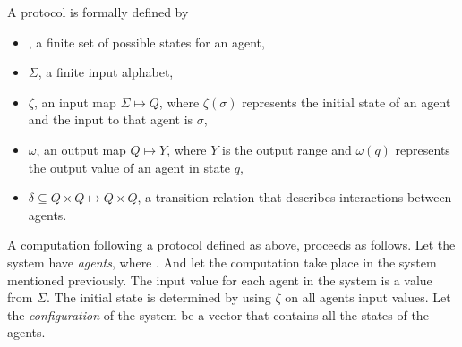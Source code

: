  A protocol is formally defined by
 \begin{itemize}
     \item {}, a finite set of possible states for an agent,
     \item $\Sigma$, a finite input alphabet,
     \item $\zeta$, an input map $\Sigma \mapsto Q$, where $\zeta(\sigma)$ represents the initial state of an agent and the input to that agent is $\sigma$,
     \item $\omega$, an output map $Q \mapsto Y$, where $Y$ is the output range and $\omega(q)$ represents the output value of an agent in state $q$,
     \item $\delta \subseteq Q \times Q \mapsto Q \times Q$, a transition relation that describes interactions between agents.
     
 \end{itemize}

A computation following a protocol defined as above, proceeds as follows. Let the system have  \emph{agents}, where . And let the computation take place in the system mentioned previously. The input value for each agent in the system is a value from $\Sigma$. The initial state is determined by using $\zeta$ on all agents input values. Let the \emph{configuration} of the system be a vector  that contains all the states of the agents. 

